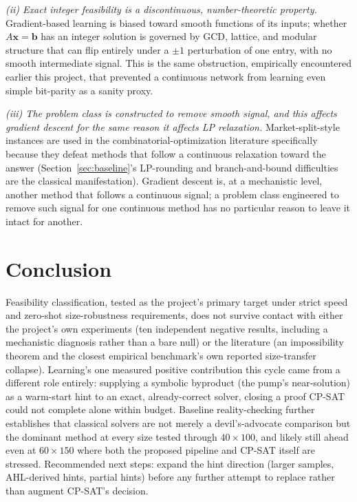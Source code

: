 \documentclass[12pt]{article}
\begin{document}
\emph{(ii) Exact integer feasibility is a discontinuous, number-theoretic property.} Gradient-based learning is biased toward smooth functions of its inputs; whether $A\mathbf{x}=\mathbf{b}$ has an integer solution is governed by GCD, lattice, and modular structure that can flip entirely under a $\pm1$ perturbation of one entry, with no smooth intermediate signal. This is the same obstruction, empirically encountered earlier this project, that prevented a continuous network from learning even simple bit-parity as a sanity proxy.

\emph{(iii) The problem class is constructed to remove smooth signal, and this affects gradient descent for the same reason it affects LP relaxation.} Market-split-style instances are used in the combinatorial-optimization literature specifically because they defeat methods that follow a continuous relaxation toward the answer (Section~\ref{sec:baseline}'s LP-rounding and branch-and-bound difficulties are the classical manifestation). Gradient descent is, at a mechanistic level, another method that follows a continuous signal; a problem class engineered to remove such signal for one continuous method has no particular reason to leave it intact for another.

\section{Conclusion}

Feasibility classification, tested as the project's primary target under strict speed and zero-shot size-robustness requirements, does not survive contact with either the project's own experiments (ten independent negative results, including a mechanistic diagnosis rather than a bare null) or the literature (an impossibility theorem and the closest empirical benchmark's own reported size-transfer collapse). Learning's one measured positive contribution this cycle came from a different role entirely: supplying a symbolic byproduct (the pump's near-solution) as a warm-start hint to an exact, already-correct solver, closing a proof CP-SAT could not complete alone within budget. Baseline reality-checking further establishes that classical solvers are not merely a devil's-advocate comparison but the dominant method at every size tested through $40\times100$, and likely still ahead even at $60\times150$ where both the proposed pipeline and CP-SAT itself are stressed. Recommended next steps: expand the hint direction (larger samples, AHL-derived hints, partial hints) before any further attempt to replace rather than augment CP-SAT's decision.
\end{document}
